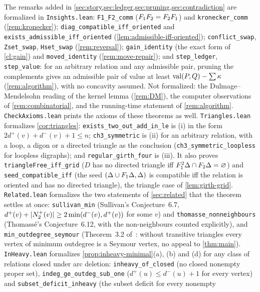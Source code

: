 The remarks added in \cref{sec:story,sec:ledger,sec:pruning,sec:contradiction}
are formalized in \texttt{Insights.lean}: \texttt{F1\_F2\_comm} ($F_1F_2=F_2F_1$)
and \texttt{kronecker\_comm} (\cref{rem:kronecker});
\texttt{diag\_compatible\_iff\_oriented} and
\texttt{exists\_admissible\_iff\_oriented} (\cref{lem:admissible-iff-oriented});
\texttt{conflict\_swap}, \texttt{Zset\_swap}, \texttt{Hset\_swap}
(\cref{rem:reversal}); \texttt{gain\_identity} (the exact form of
\cref{cl:gain}) and \texttt{moved\_identity} (\cref{rem:move-repair});
and \texttt{step\_ledger}, \texttt{step\_value}: for an arbitrary relation
and any admissible pair, pruning the complements gives an admissible pair of
value at least $\operatorname{val}(P,Q)-\sum\kappa$ (\cref{rem:algorithm}), with no
concavity assumed. Not formalized: the Dulmage--Mendelsohn reading of the
kernel lemma (\cref{rem:DM}), the computer observations of
\cref{rem:combinatorial}, and the running-time statement of
\cref{rem:algorithm}. \texttt{CheckAxioms.lean} prints the axioms of
these theorems as well.
\texttt{Triangles.lean} formalizes \cref{cor:triangles}:
\texttt{exists\_two\_out\_add\_in\_le} is (i) in the form
$2d^+(v)+d^-(v)+1\le n$; \texttt{ch3\_symmetric} is (ii) for an arbitrary
relation, with a loop, a digon or a directed triangle as the conclusion
(\texttt{ch3\_symmetric\_loopless} for loopless digraphs); and
\texttt{regular\_girth\_four} is (iii). It also proves
\texttt{triangleFree\_iff\_grid} ($D$ has no directed triangle iff
$F_1^2\Delta\cap F_2\Delta=\varnothing$) and \texttt{seed\_compatible\_iff}
(the seed $(\Delta\cup F_1\Delta,\Delta)$ is compatible iff the relation is
oriented and has no directed triangle), the triangle case of
\cref{lem:girth-grid}. \texttt{Related.lean} formalizes the two statements of
\cref{sec:related} that the theorem settles at once: \texttt{sullivan\_min}
(Sullivan's Conjecture~6.7, $d^+(v)+\lvert N^+_2(v)\rvert\ge2\min(d^-(v),d^+(v))$ for some
$v$) and \texttt{thomasse\_nonneighbours} (Thomass\'e's Conjecture~6.12, with the
non-neighbours counted explicitly), and \texttt{min\_outdegree\_seymour} (Theorem~3.2
of~\cite{BrantnerBrockmanKaySnively2009}: without transitive triangles every vertex
of minimum outdegree is a Seymour vertex, no appeal to \cref{thm:main}).
\texttt{InHeavy.lean} formalizes
\cref{prop:inheavy-minimal}(a), (b) and (d) for any class of relations
closed under arc deletion: \texttt{inheavy\_of\_closed} (no closed
nonempty proper set), \texttt{indeg\_ge\_outdeg\_sub\_one}
($d^+(u)\le d^-(u)+1$ for every vertex) and
\texttt{subset\_deficit\_inheavy} (the subset deficit for every nonempty
